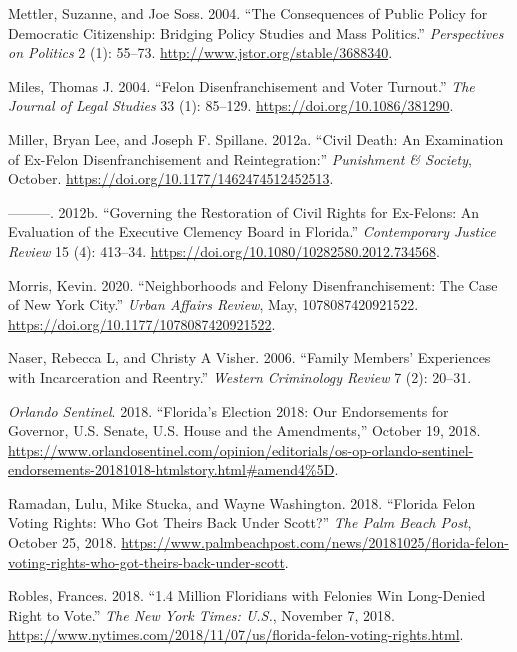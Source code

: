 \documentclass[
  12pt,
]{article}
\newlength{\cslhangindent}
\newenvironment{cslreferences}%
  {\setlength{\parindent}{0pt}%
  \everypar{\setlength{\hangindent}{\cslhangindent}}\ignorespaces}%
  {\par}
\begin{document}
\begin{cslreferences}
\leavevmode\hypertarget{ref-Mettler2004}{}%
Mettler, Suzanne, and Joe Soss. 2004. ``The Consequences of Public Policy for Democratic Citizenship: Bridging Policy Studies and Mass Politics.'' \emph{Perspectives on Politics} 2 (1): 55--73. \url{http://www.jstor.org/stable/3688340}.

\leavevmode\hypertarget{ref-Miles2004}{}%
Miles, Thomas J. 2004. ``Felon Disenfranchisement and Voter Turnout.'' \emph{The Journal of Legal Studies} 33 (1): 85--129. \url{https://doi.org/10.1086/381290}.

\leavevmode\hypertarget{ref-Miller2012}{}%
Miller, Bryan Lee, and Joseph F. Spillane. 2012a. ``Civil Death: An Examination of Ex-Felon Disenfranchisement and Reintegration:'' \emph{Punishment \& Society}, October. \url{https://doi.org/10.1177/1462474512452513}.

\leavevmode\hypertarget{ref-Miller2012a}{}%
---------. 2012b. ``Governing the Restoration of Civil Rights for Ex-Felons: An Evaluation of the Executive Clemency Board in Florida.'' \emph{Contemporary Justice Review} 15 (4): 413--34. \url{https://doi.org/10.1080/10282580.2012.734568}.

\leavevmode\hypertarget{ref-Morris2020}{}%
Morris, Kevin. 2020. ``Neighborhoods and Felony Disenfranchisement: The Case of New York City.'' \emph{Urban Affairs Review}, May, 1078087420921522. \url{https://doi.org/10.1177/1078087420921522}.

\leavevmode\hypertarget{ref-Naser2006}{}%
Naser, Rebecca L, and Christy A Visher. 2006. ``Family Members' Experiences with Incarceration and Reentry.'' \emph{Western Criminology Review} 7 (2): 20--31.

\leavevmode\hypertarget{ref-ORLANDOSENTINEL2018}{}%
\emph{Orlando Sentinel}. 2018. ``Florida's Election 2018: Our Endorsements for Governor, U.S. Senate, U.S. House and the Amendments,'' October 19, 2018. \url{https://www.orlandosentinel.com/opinion/editorials/os-op-orlando-sentinel-endorsements-20181018-htmlstory.html\#amend4\%5D}.

\leavevmode\hypertarget{ref-Ramadan2018}{}%
Ramadan, Lulu, Mike Stucka, and Wayne Washington. 2018. ``Florida Felon Voting Rights: Who Got Theirs Back Under Scott?'' \emph{The Palm Beach Post}, October 25, 2018. \url{https://www.palmbeachpost.com/news/20181025/florida-felon-voting-rights-who-got-theirs-back-under-scott}.

\leavevmode\hypertarget{ref-Robles2018}{}%
Robles, Frances. 2018. ``1.4 Million Floridians with Felonies Win Long-Denied Right to Vote.'' \emph{The New York Times: U.S.}, November 7, 2018. \url{https://www.nytimes.com/2018/11/07/us/florida-felon-voting-rights.html}.


\end{cslreferences}
\end{document}
